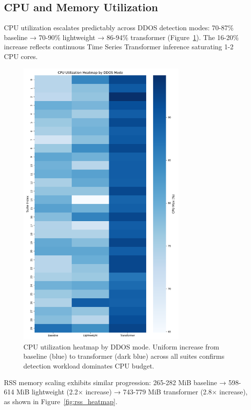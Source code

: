 \documentclass[11pt,a4paper]{article}
\begin{document}
\subsection{CPU and Memory Utilization}

CPU utilization escalates predictably across DDOS detection modes: 70-87\% baseline → 70-90\% lightweight → 86-94\% transformer (Figure~\ref{fig:cpu_heatmap}). The 16-20\% increase reflects continuous Time Series Transformer inference saturating 1-2 CPU cores.

\begin{figure}[H]
\centering
\includegraphics[width=0.75\textwidth]{../figures/figure11_cpu_utilization_heatmap.png}
\caption{CPU utilization heatmap by DDOS mode. Uniform increase from baseline (blue) to transformer (dark blue) across all suites confirms detection workload dominates CPU budget.}
\label{fig:cpu_heatmap}
\end{figure}

RSS memory scaling exhibits similar progression: 265-282 MiB baseline → 598-614 MiB lightweight (2.2× increase) → 743-779 MiB transformer (2.8× increase), as shown in Figure~\ref{fig:rss_heatmap}.
\end{document}
